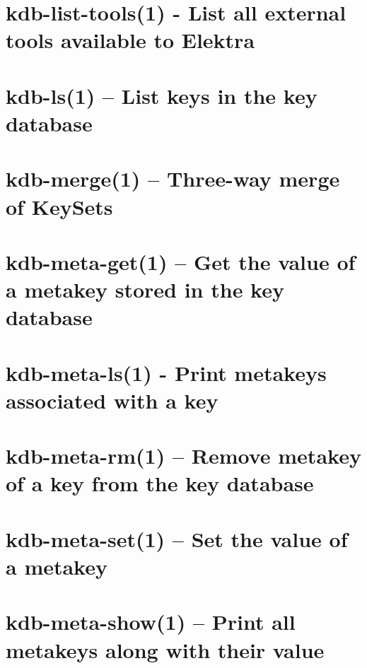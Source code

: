 \let\mypdfximage\pdfximage\def\pdfximage{\immediate\mypdfximage}\documentclass[twoside]{book}
\newcommand{\+}{\discretionary{\mbox{\scriptsize$\hookleftarrow$}}{}{}}
\begin{document}
\chapter{kdb-\/list-\/tools(1) -\/ List all external tools available to Elektra}
\label{doc_help_kdb-list-tools_md}

\chapter{kdb-\/ls(1) -- List keys in the key database}
\label{doc_help_kdb-ls_md}

\chapter{kdb-\/merge(1) -- Three-\/way merge of Key\+Sets}
\label{doc_help_kdb-merge_md}

\chapter{kdb-\/meta-\/get(1) -- Get the value of a metakey stored in the key database}
\label{doc_help_kdb-meta-get_md}

\chapter{kdb-\/meta-\/ls(1) -\/ Print metakeys associated with a key}
\label{doc_help_kdb-meta-ls_md}

\chapter{kdb-\/meta-\/rm(1) -- Remove metakey of a key from the key database}
\label{doc_help_kdb-meta-rm_md}

\chapter{kdb-\/meta-\/set(1) -- Set the value of a metakey}
\label{doc_help_kdb-meta-set_md}

\chapter{kdb-\/meta-\/show(1) -- Print all metakeys along with their value}
\label{doc_help_kdb-meta-show_md}

\end{document}
